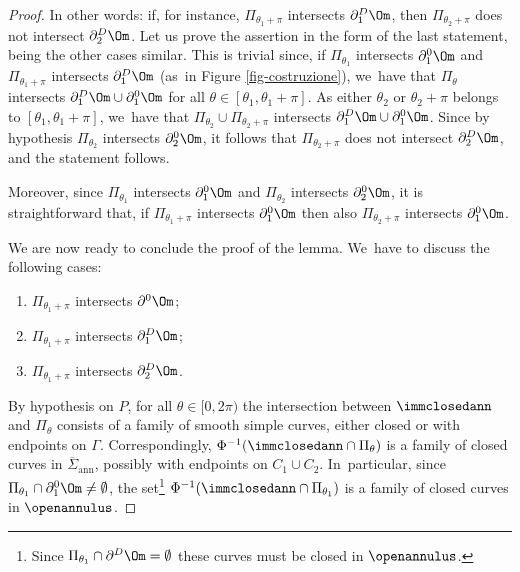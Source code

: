 \begin{proof}
In other words: if, for instance, $\Pi_{\theta_1+\pi}$ intersects $\partial_1^D\Om$, then $\Pi_{\theta_2+\pi}$ does not intersect $\partial_2^D\Om$. Let us prove the assertion in the form of the last statement, being the other
cases similar. This is trivial since, if $\Pi_{\theta_1}$ intersects $\partial_1^0\Om$ and $\Pi_{\theta_1+\pi}$ intersects $\partial_1^D\Om$ (as~in Figure \ref{fig-costruzione}), we~have that $\Pi_{\theta}$ intersects $\partial_1^D\Om\cup\partial_1^0\Om$ for all $\theta\in [\theta_1,\theta_1+\pi]$. As either $\theta_2$ or $\theta_2+\pi$ belongs to $[\theta_1,\theta_1+\pi]$, we~have that $\Pi_{\theta_2}\cup\Pi_{\theta_2+\pi}$ intersects $\partial_1^D\Om\cup\partial_1^0\Om$. Since by hypothesis $\Pi_{\theta_2}$ intersects $\partial_2^0\Om$, it follows that $\Pi_{\theta_2+\pi}$ does not intersect $\partial_2^D\Om$, and the statement follows.

Moreover, since $\Pi_{\theta_1}$ intersects $\partial^0_1\Om$ and $\Pi_{\theta_2}$ intersects $\partial^0_2\Om$, it is straightforward that, if $\Pi_{\theta_1+\pi}$ intersects $\partial_1^0\Om$ then also $\Pi_{\theta_2+\pi}$ intersects $\partial_1^0\Om$.

We are now ready to conclude the proof of the lemma. We~have to discuss the following cases:
\begin{enumerate}[(1),wide]
\item\label{case:new1}
$\Pi_{\theta_1+\pi}$ intersects $\partial^0\Om$;
\item\label{case:new2}
$\Pi_{\theta_1+\pi}$ intersects $\partial_1^D\Om$;
\item\label{case:new3}
$\Pi_{\theta_1+\pi}$ intersects $\partial_2^D\Om$.
\end{enumerate}
By hypothesis on $P$, for all $\theta\in[0,2\pi)$ the intersection between $\immclosedann$ and $\Pi_\theta$ consists of a
family of smooth simple curves, either closed or with endpoints on $\Gamma$. Correspondingly, $\Phi^{-1}(\immclosedann\cap \Pi_\theta)$ is a family of closed curves in
$\overline\Sigma_\mathrm{ann}$, possibly with endpoints on $C_1\cup C_2$.
In~particular, since $\Pi_{\theta_1} \cap \partial^0_1\Om \neq \emptyset$, the set\footnote{Since $\Pi_{\theta_1} \cap \partial^D\Om = \emptyset$ these curves must be closed in $\openannulus$.} $\Phi^{-1}
(\immclosedann\cap \Pi_{\theta_1})$ is a family of closed curves in $\openannulus$.


\end{proof}
